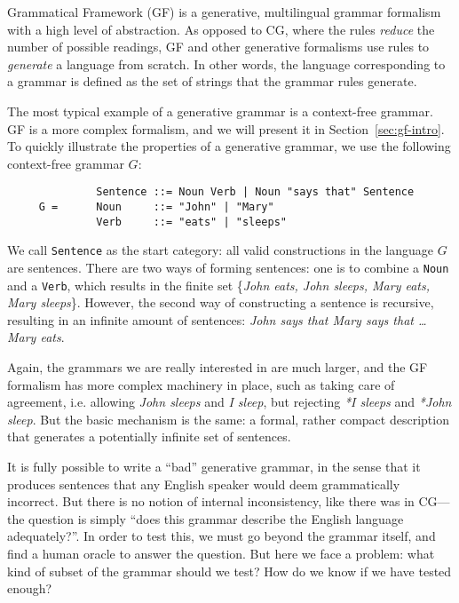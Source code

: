 Grammatical Framework (GF) \cite{ranta2011gfbook} is a generative, multilingual grammar formalism with a high level of abstraction.
As opposed to CG, where the rules \emph{reduce} the number of possible readings, GF and other generative formalisms use rules to \emph{generate} a language from scratch. In other words, the language corresponding to a grammar is defined as the set of strings that the grammar rules generate.

The most typical example of a generative grammar is a context-free grammar. GF is a more complex formalism, and we will present it in Section~\ref{sec:gf-intro}. To quickly illustrate the properties of a generative grammar, we use the following context-free grammar $G$:

\begin{verbatim}
              Sentence ::= Noun Verb | Noun "says that" Sentence
     G =      Noun     ::= "John" | "Mary"
              Verb     ::= "eats" | "sleeps"
\end{verbatim}

We call \texttt{Sentence} as the start category: all valid constructions in the language $G$ are sentences. There are two ways of forming sentences: one is to combine a \texttt{Noun} and a \texttt{Verb}, which results in the finite set \{\emph{John eats, John sleeps, Mary eats, Mary sleeps}\}. However, the second way of constructing a sentence is recursive, resulting in an infinite amount of sentences: \emph{John says that Mary says that \dots Mary eats}.

Again, the grammars we are really interested in are much larger, and the GF formalism has more complex machinery in place, such as taking care of agreement, i.e. allowing \emph{John sleeps} and \emph{I sleep}, but rejecting \emph{*I sleeps} and \emph{*John sleep}. But the basic mechanism is the same: a formal, rather compact description that generates a potentially infinite set of sentences.

It is fully possible to write a ``bad'' generative grammar, in the sense that it produces sentences that any English speaker would deem grammatically incorrect. But there is no notion of internal inconsistency, like there was in CG---the question is simply ``does this grammar describe the English language adequately?''.
In order to test this, we must go beyond the grammar itself, and find a human oracle to answer the question.
But here we face a problem: what kind of subset of the grammar should we test? How do we know if we have tested enough?

